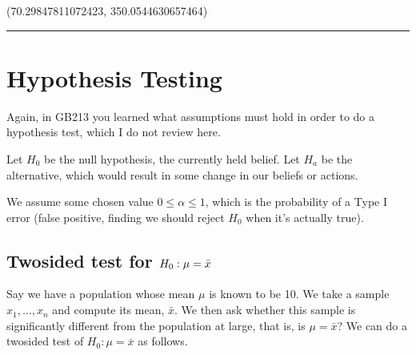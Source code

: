 \documentclass[letterpaper,10pt,english]{sphinxmanual}
\begin{document}
\begin{sphinxVerbatim}[commandchars=\\\{\}]
(70.29847811072423, 350.0544630657464)
\end{sphinxVerbatim}


\bigskip\hrule\bigskip



\section{Hypothesis Testing}
\label{\detokenize{GB213-review-in-Python:hypothesis-testing}}
Again, in GB213 you learned what assumptions must hold in order to do a hypothesis test, which I do not review here.

Let \(H_0\) be the null hypothesis, the currently held belief.  Let \(H_a\) be the alternative, which would result in some change in our beliefs or actions.

We assume some chosen value \(0\leq\alpha\leq1\), which is the probability of a Type I error (false positive, finding we should reject \(H_0\) when it’s actually true).


\subsection{Two\sphinxhyphen{}sided test for \protect\(H_0:\mu=\bar{x}\protect\)}
\label{\detokenize{GB213-review-in-Python:two-sided-test-for-h-0-mu-bar-x}}
Say we have a population whose mean \(\mu\) is known to be 10.  We take a sample \(x_1,\ldots,x_n\) and compute its mean, \(\bar{x}\).  We then ask whether this sample is significantly different from the population at large, that is, is \(\mu=\bar{x}\)?  We can do a two\sphinxhyphen{}sided test of \(H_0:\mu=\bar{x}\) as follows.

\begin{sphinxVerbatim}[commandchars=\\\{\}]
  
  
  \PYG{p}{[}      \PYG{p}{]}
      
    
  
\end{sphinxVerbatim}
\end{document}
